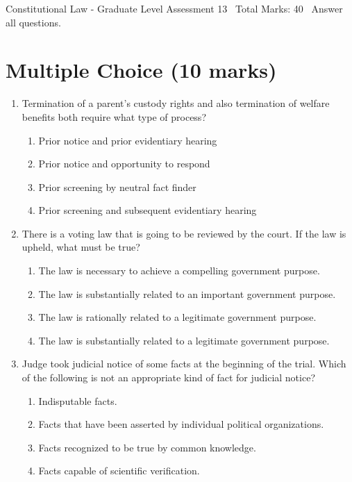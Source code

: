 \documentclass[12pt]{article}
\begin{document}
\begin{center}
Constitutional Law - Graduate Level Assessment 13 \
Total Marks: 40 \
Answer all questions.
\end{center}

\section*{Multiple Choice (10 marks)}
\begin{enumerate}[label=\arabic*.]
\item Termination of a parent's custody rights and also termination of welfare benefits both require what type of process?
\begin{enumerate}[label=(\alph*)]
    \item Prior notice and prior evidentiary hearing
    \item Prior notice and opportunity to respond
    \item Prior screening by neutral fact finder
    \item Prior screening and subsequent evidentiary hearing
\end{enumerate}
\item There is a voting law that is going to be reviewed by the court. If the law is upheld, what must be true?
\begin{enumerate}[label=(\alph*)]
    \item The law is necessary to achieve a compelling government purpose.
    \item The law is substantially related to an important government purpose.
    \item The law is rationally related to a legitimate government purpose.
    \item The law is substantially related to a legitimate government purpose.
\end{enumerate}
\item Judge took judicial notice of some facts at the beginning of the trial. Which of the following is not an appropriate kind of fact for judicial notice?
\begin{enumerate}[label=(\alph*)]
    \item Indisputable facts.
    \item Facts that have been asserted by individual political organizations.
    \item Facts recognized to be true by common knowledge.
    \item Facts capable of scientific verification.
\end{enumerate}

\end{enumerate}
\end{document}
